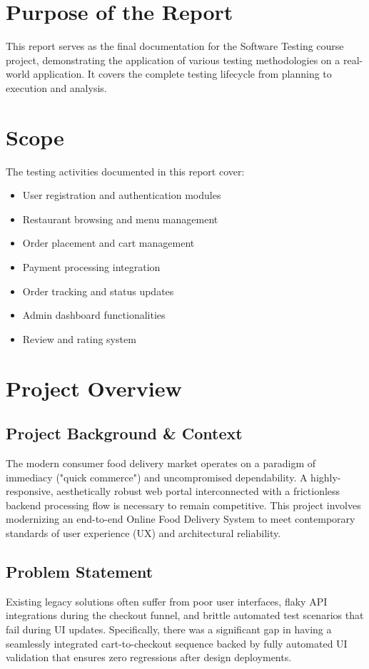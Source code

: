 \documentclass[12pt,a4paper]{report}
\begin{document}
\section{Purpose of the Report}
This report serves as the final documentation for the Software Testing course project, demonstrating the application of various testing methodologies on a real-world application. It covers the complete testing lifecycle from planning to execution and analysis.

\section{Scope}
The testing activities documented in this report cover:
\begin{itemize}
    \item User registration and authentication modules
    \item Restaurant browsing and menu management
    \item Order placement and cart management
    \item Payment processing integration
    \item Order tracking and status updates
    \item Admin dashboard functionalities
    \item Review and rating system
\end{itemize}

\section{Project Overview}

\subsection{Project Background \& Context}
The modern consumer food delivery market operates on a paradigm of immediacy ("quick commerce") and uncompromised dependability. A highly-responsive, aesthetically robust web portal interconnected with a frictionless backend processing flow is necessary to remain competitive. This project involves modernizing an end-to-end Online Food Delivery System to meet contemporary standards of user experience (UX) and architectural reliability. 

\subsection{Problem Statement}
Existing legacy solutions often suffer from poor user interfaces, flaky API integrations during the checkout funnel, and brittle automated test scenarios that fail during UI updates. Specifically, there was a significant gap in having a seamlessly integrated cart-to-checkout sequence backed by fully automated UI validation that ensures zero regressions after design deployments.
\end{document}
